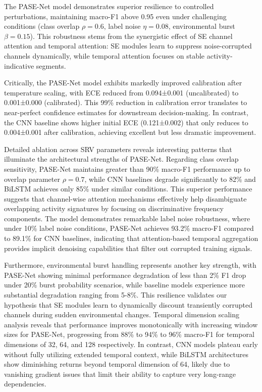\documentclass[lettersize,journal]{IEEEtran}
\begin{document}
The PASE-Net model demonstrates superior resilience to controlled perturbations, maintaining macro-F1 above 0.95 even under challenging conditions (class overlap $\rho=0.6$, label noise $\eta=0.08$, environmental burst $\beta=0.15$). This robustness stems from the synergistic effect of SE channel attention and temporal attention: SE modules learn to suppress noise-corrupted channels dynamically, while temporal attention focuses on stable activity-indicative segments.

Critically, the PASE-Net model exhibits markedly improved calibration after temperature scaling, with ECE reduced from 0.094±0.001 (uncalibrated) to 0.001±0.000 (calibrated). This 99\% reduction in calibration error translates to near-perfect confidence estimates for downstream decision-making. In contrast, the CNN baseline shows higher initial ECE (0.121±0.002) that only reduces to 0.004±0.001 after calibration, achieving excellent but less dramatic improvement.

Detailed ablation across SRV parameters reveals interesting patterns that illuminate the architectural strengths of PASE-Net. Regarding class overlap sensitivity, PASE-Net maintains greater than 90\% macro-F1 performance up to overlap parameter $\rho=0.7$, while CNN baselines degrade significantly to 82\% and BiLSTM achieves only 85\% under similar conditions. This superior performance suggests that channel-wise attention mechanisms effectively help disambiguate overlapping activity signatures by focusing on discriminative frequency components. The model demonstrates remarkable label noise robustness, where under 10\% label noise conditions, PASE-Net achieves 93.2\% macro-F1 compared to 89.1\% for CNN baselines, indicating that attention-based temporal aggregation provides implicit denoising capabilities that filter out corrupted training signals.

Furthermore, environmental burst handling represents another key strength, with PASE-Net showing minimal performance degradation of less than 2\% F1 drop under 20\% burst probability scenarios, while baseline models experience more substantial degradation ranging from 5-8\%. This resilience validates our hypothesis that SE modules learn to dynamically discount transiently corrupted channels during sudden environmental changes. Temporal dimension scaling analysis reveals that performance improves monotonically with increasing window sizes for PASE-Net, progressing from 88\% to 94\% to 96\% macro-F1 for temporal dimensions of 32, 64, and 128 respectively. In contrast, CNN models plateau early without fully utilizing extended temporal context, while BiLSTM architectures show diminishing returns beyond temporal dimension of 64, likely due to vanishing gradient issues that limit their ability to capture very long-range dependencies.
\end{document}
